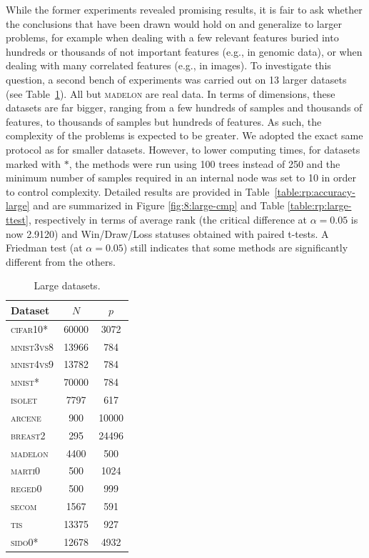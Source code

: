 While the former experiments revealed promising results, it is fair to ask
whether the conclusions that have been drawn would hold on and generalize to
larger problems, for example when dealing with a few relevant features buried
into hundreds or thousands of not important features (e.g., in genomic data),
or when dealing with many correlated features (e.g., in images). To investigate
this question, a second bench of experiments was carried out on 13 larger
datasets (see Table~\ref{table:rp:large-data}). All but
\textsc{madelon} are real data. In terms of dimensions, these datasets are far bigger,
ranging from a few hundreds of samples and thousands of features, to thousands of
samples but hundreds of features. As such, the complexity of the problems is
expected to be greater.  We adopted the exact same protocol as for smaller
datasets. However, to lower computing times, for datasets marked with $*$, the
methods were run using 100 trees instead of 250 and the minimum number of
samples required in an internal node was set to 10 in order to control
complexity. Detailed results are provided in Table~\ref{table:rp:accuracy-large}
and are summarized in Figure \ref{fig:8:large-cmp} and
Table \ref{table:rp:large-ttest}, respectively in terms of average rank (the
critical difference at $\alpha=0.05$ is now 2.9120) and Win/Draw/Loss statuses
obtained with paired t-tests. A Friedman test (at $\alpha=0.05$) still
indicates that some methods are significantly different from the others.

\begin{table}
    \centering
    \footnotesize
    \begin{tabular}{| l | c c |}
    \hline
    \textbf{Dataset} & $N$ & $p$ \\
    \hline
    \hline
                \textsc{cifar10}*   & 60000   & 3072   \\
                \textsc{mnist3vs8}  & 13966   & 784    \\
                \textsc{mnist4vs9}  & 13782   & 784    \\
                \textsc{mnist}*     & 70000   & 784    \\
                \textsc{isolet}     & 7797    & 617    \\
                \textsc{arcene}     & 900     & 10000  \\
                \textsc{breast2}    & 295     & 24496  \\
                \textsc{madelon}    & 4400    & 500    \\
                \textsc{marti0}     & 500     & 1024   \\
                \textsc{reged0}     & 500     & 999    \\
                \textsc{secom}      & 1567    & 591    \\
                \textsc{tis}        & 13375   & 927    \\
                \textsc{sido0}*     & 12678   & 4932   \\
    \hline
    \end{tabular}
    \caption{Large datasets.}
    \label{table:rp:large-data}
\end{table}

